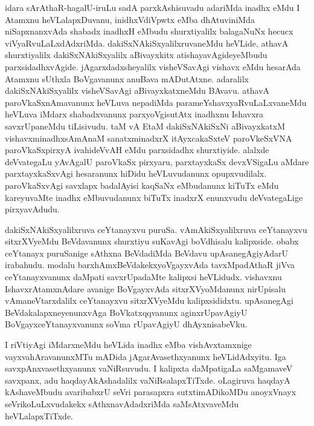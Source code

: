 \begin{artha}
idara sArAthaR-hagalU-iruLu sadA parxkAshisuvadu adariMda inadhx eMdu I Atamxnu heVLalapxDuvanu, inidhxVdiVpwtx eMba dhAtuviniMda niSapxnanxvAda shabadx inadhxH eMbudu shurxtiyalilx balagaNuNx hecucx viVyaRvuLaLxdAdxriMda. dakiSxNAkiSxyalilxruvaneMdu heVLide, athavA shurxtiyalilx dakiSxNAkiSxyalilx aBivayxkitx atishayavAgideyeMbudu parxsidadhxvAgide. jAgarxdadxsheyalilx visheVSavAgi vishavx eMdu hesarAda Atamxnu sUthxla BoVgavanunx anuBava mADutAtxne. adaralilx dakiSxNAkiSxyalilx visheVSavAgi aBivayxkatxneMdu BAvavu. athavA paroVkaSxnAmavanunx heVLuva nepadiMda parameYshavxyaRvuLaLxvaneMdu heVLuva iMdarx shabadxvanunx parxyoVgisutAtx inadhxnu Ishavxra savxrUpaneMdu tiLisivudu. taM vA EtaM dakiSxNAkiSxNi aBivayxkatxM vishavxminadhxsAmAnaM sanatxminadxrX itAyxcakaSxteV paroVkeSxVNA paroVkaSxpirxyA ivahideVvAH eMdu parxsidadhx shurxtiyide. alalxde deVvategaLu yAvAgalU paroVkaSx pirxyaru, parxtayxkaSx devxVSigaLu aMdare parxtayxkaSxvAgi hesaranunx hiDidu heVLuvudanunx opupxvudilalx. paroVkaSxvAgi savxlapx badalAyisi kaqSaNx eMbudanunx kiTuTx eMdu kareyuvaMte inadhx eMbuvudanunx biTuTx inadxrX enunxvudu deVvategaLige pirxyavAdudu. 
\end{artha}


\begin{artha}
dakiSxNAkiSxyalilxruva ceYtanayxvu puruSa. vAmAkiSxyalilxruva ceYtanayxvu sitxrXVyeMdu BeVdavanunx shurxtiyu suKavAgi boVdhisalu kalipxside. obabx ceYtanayx puruSanige sAthxna BeVdadiMda BeVdavu upAsanegAgiyAdarU irabahudu. modalu barxhAmxBeVdakekxyoVgayxvAda tavxMpadAthaR jiVva ceYtanayxvanunx daMpati savxrUpadaMte kalipxsi heVLidudx. vishavxnu IshavxrAtamxnAdare avanige BoVgayxvAda sitxrXVyoMdanunx nirUpisalu vAmaneVtarxdalilx ceYtanayxvu sitxrXVyeMdu kalipxsididxtu. upAsanegAgi BeVdakalapxneyenunxvAga BoVkatxqqvanunx aginxrUpavAgiyU BoVgayxceYtanayxvanunx soVma rUpavAgiyU dhAyxnisabeVku.
\end{artha}

\begin{artha}
I riVtiyAgi iMdarxneMdu heVLida inadhx eMba vishAvxtamxnige vayxvahAravanunxMTu mADida jAgarAvasethxyanunx heVLidAdxyitu. Iga savxpAnxvasethxyanunx vaNiRsuvudu. I kalipxta daMpatigaLa saMgamaveV savxpanx, adu haqdayAkAshadalilx vaNiRsalapxTiTxde. oLagiruva haqdayA kAshaveMbudu avaribabxrU seVri parasapxra sutxtimADikoMDu anoyxVnayx seVrikoLuLxvudakekx sAthxnavAdadxriMda saMsAtxvaveMdu heVLalapxTiTxde. 
\end{artha}

